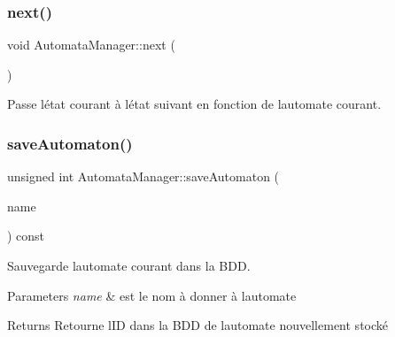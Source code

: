 \mbox{\label{class_automata_manager_ae7788f4fb5ae9c6f4ffaf6b471d969ad}} 
\subsubsection{\texorpdfstring{next()}{next()}}
{\footnotesize\ttfamily void Automata\+Manager\+::next (\begin{DoxyParamCaption}{ }\end{DoxyParamCaption})}



Passe l\textquotesingle{}état courant à l\textquotesingle{}état suivant en fonction de l\textquotesingle{}automate courant. 

\mbox{\label{class_automata_manager_af35d1dbd73d340306477c923d385929a}} 
\subsubsection{\texorpdfstring{save\+Automaton()}{saveAutomaton()}}
{\footnotesize\ttfamily unsigned int Automata\+Manager\+::save\+Automaton (\begin{DoxyParamCaption}\item[{Q\+String const \&}]{name }\end{DoxyParamCaption}) const}



Sauvegarde l\textquotesingle{}automate courant dans la B\+DD. 


\begin{DoxyParams}{Parameters}
{\em name} & est le nom à donner à l\textquotesingle{}automate \\
\hline
\end{DoxyParams}
\begin{DoxyReturn}{Returns}
Retourne l\textquotesingle{}ID dans la B\+DD de l\textquotesingle{}automate nouvellement stocké 
\end{DoxyReturn}
\mbox{\label{class_automata_manager_ade711c622353cbdad0f33d5813cbbcae}} 

